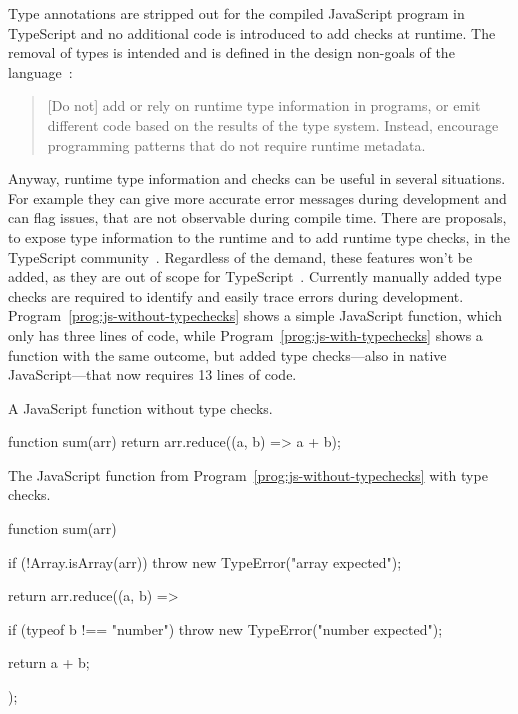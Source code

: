 Type annotations are stripped out for the compiled JavaScript program in TypeScript and no additional code is introduced to add checks at runtime. The removal of types is intended and is defined in the design non-goals of the language~\cite{TypeScriptWiki:DesignGoals}:
\begin{quote}
  [Do not] add or rely on runtime type information in programs,
  or emit different code based on the results of the type system.
  Instead, encourage programming patterns that do not require runtime metadata.
\end{quote}
Anyway, runtime type information and checks can be useful in several situations. 
For example they can give more accurate error messages during development and can 
flag issues, that are not observable during compile time.
There are proposals, to expose type information to the runtime and to add runtime type
checks, in the TypeScript community~\cites{TypeScriptIssue:RuntimeTypeChecking, TypeScriptIssue:RuntimeTypeChecks, TypeScriptIssue:EmitTypeArguments}. Regardless of the demand, these features won't be added, as they are out of scope
for TypeScript~\cite{TypeScriptIssue:RuntimeTypeChecking:Comment:OutOfScope, TypeScriptIssue:EmitTypeArguments:Comment:OutOfScope}.
Currently manually added type checks are required to identify and easily trace errors during development. Program~\ref{prog:js-without-typechecks} shows a simple JavaScript function, which only has three lines of code, while Program~\ref{prog:js-with-typechecks} shows a function with the same outcome, but added type 
checks---also in native JavaScript---that now requires 13 lines of code.
\begin{program}
\caption{A JavaScript function without type checks.}
\label{prog:js-without-typechecks}
\begin{JsCode}
function sum(arr) {
  return arr.reduce((a, b) =>  a + b);
}
\end{JsCode}
\end{program}
\begin{program}
\caption{The JavaScript function from Program~\ref{prog:js-without-typechecks} with type checks.}
\label{prog:js-with-typechecks}
\begin{JsCode}
function sum(arr) {
  if (!Array.isArray(arr)) {
    throw new TypeError("array expected");
  }
  
  return arr.reduce((a, b) => {
    if (typeof b !== "number") {
      throw new TypeError("number expected");
    }
    
    return a + b;
  });
}
\end{JsCode}
\end{program}
